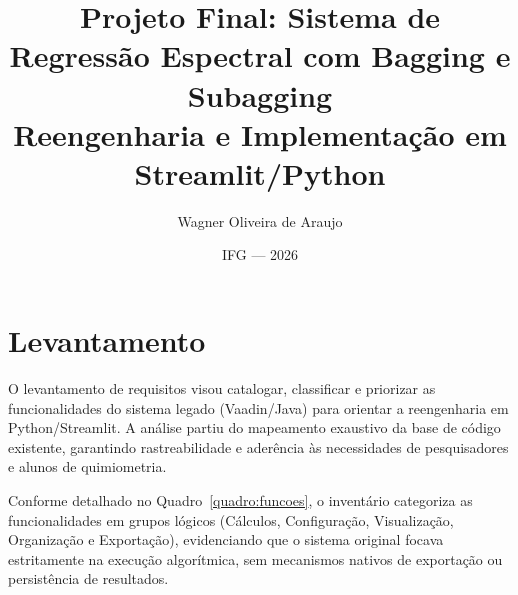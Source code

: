 \documentclass[12pt,a4paper]{article}
\begin{document}
\title{\textbf{Projeto Final: Sistema de Regressão Espectral com Bagging e Subagging}\\
\small Reengenharia e Implementação em Streamlit/Python}
\author{Wagner Oliveira de Araujo}
\date{IFG --- 2026}
\maketitle
\thispagestyle{empty}

\newpage
\tableofcontents
\newpage

\section{Levantamento}

O levantamento de requisitos visou catalogar, classificar e priorizar as funcionalidades do sistema legado (Vaadin/Java) para orientar a reengenharia em Python/Streamlit. A análise partiu do mapeamento exaustivo da base de código existente, garantindo rastreabilidade e aderência às necessidades de pesquisadores e alunos de quimiometria.

Conforme detalhado no Quadro~\ref{quadro:funcoes}, o inventário categoriza as funcionalidades em grupos lógicos (Cálculos, Configuração, Visualização, Organização e Exportação), evidenciando que o sistema original focava estritamente na execução algorítmica, sem mecanismos nativos de exportação ou persistência de resultados.
\end{document}
